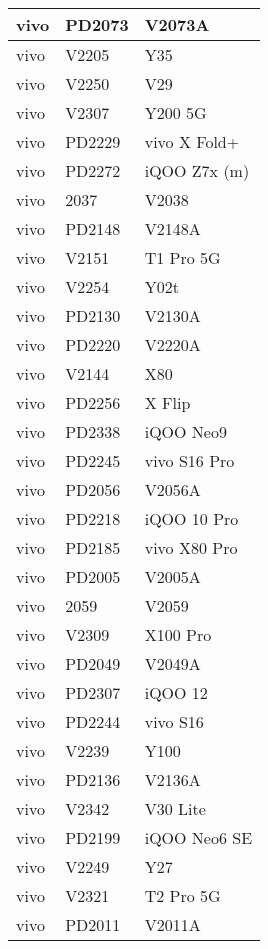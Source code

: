 \begin{tabularx}{\linewidth}{|l|X|X|}
        vivo & PD2073 & V2073A \\ \hline
        vivo & V2205 & Y35 \\ \hline
        vivo & V2250 & V29 \\ \hline
        vivo & V2307 & Y200 5G \\ \hline
        vivo & PD2229 & vivo X Fold+ \\ \hline
        vivo & PD2272 & iQOO Z7x (m) \\ \hline
        vivo & 2037 & V2038 \\ \hline
        vivo & PD2148 & V2148A \\ \hline
        vivo & V2151 & T1 Pro 5G \\ \hline
        vivo & V2254 & Y02t \\ \hline
        vivo & PD2130 & V2130A \\ \hline
        vivo & PD2220 & V2220A \\ \hline
        vivo & V2144 & X80 \\ \hline
        vivo & PD2256 & X Flip \\ \hline
        vivo & PD2338 & iQOO Neo9 \\ \hline
        vivo & PD2245 & vivo S16 Pro \\ \hline
        vivo & PD2056 & V2056A \\ \hline
        vivo & PD2218 & iQOO 10 Pro \\ \hline
        vivo & PD2185 & vivo X80 Pro \\ \hline
        vivo & PD2005 & V2005A \\ \hline
        vivo & 2059 & V2059 \\ \hline
        vivo & V2309 & X100 Pro \\ \hline
        vivo & PD2049 & V2049A \\ \hline
        vivo & PD2307 & iQOO 12 \\ \hline
        vivo & PD2244 & vivo S16 \\ \hline
        vivo & V2239 & Y100 \\ \hline
        vivo & PD2136 & V2136A \\ \hline
        vivo & V2342 & V30 Lite \\ \hline
        vivo & PD2199 & iQOO Neo6 SE \\ \hline
        vivo & V2249 & Y27 \\ \hline
        vivo & V2321 & T2 Pro 5G \\ \hline
        vivo & PD2011 & V2011A \\ \hline

\end{tabularx}
